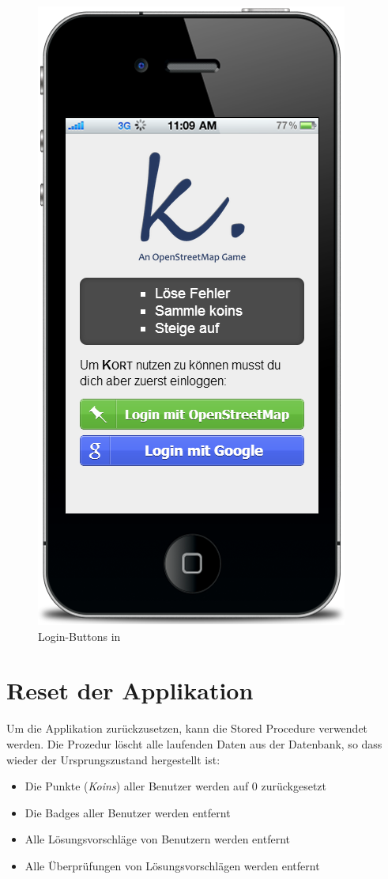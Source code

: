 \begin{figure}[H]
	\centering
	\includegraphics[scale=0.5]{images/screenshots/kort-screenshot-login}
	\caption{Login-Buttons in \kort{}}
\end{figure}

\section{Reset der Applikation}
\label{kort-reset}
Um die Applikation zurückzusetzen, kann die Stored Procedure  verwendet werden. 
Die Prozedur löscht alle laufenden Daten aus der Datenbank, so dass wieder der Ursprungszustand hergestellt ist:
\begin{itemize}
\item Die Punkte (\emph{Koins}) aller Benutzer werden auf 0 zurückgesetzt
\item Die Badges aller Benutzer werden entfernt
\item Alle Lösungsvorschläge von Benutzern werden entfernt
\item Alle Überprüfungen von Lösungsvorschlägen werden entfernt
\end{itemize}

